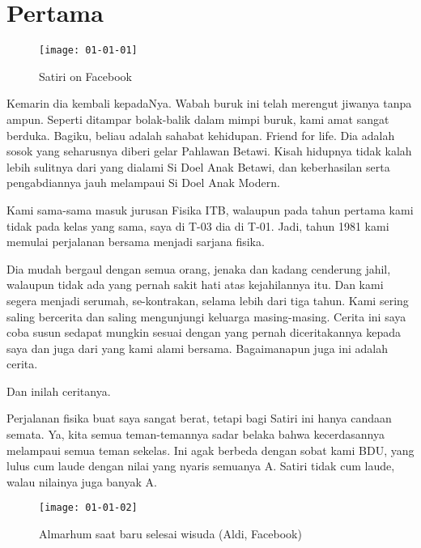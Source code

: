 
\chapter{Pertama}

\begin{figure}[htbp]
\centerline{\texttt{[image: 01-01-01]}}
\caption{Satiri on Facebook}
\label{01-01-01}
\end{figure}
%

\noindent
Kemarin dia kembali kepadaNya. 
Wabah buruk ini telah merengut jiwanya tanpa ampun. 
Seperti ditampar bolak-balik dalam mimpi buruk, kami amat sangat berduka. 
Bagiku, beliau adalah sahabat kehidupan. 
Friend for life. 
Dia adalah sosok yang seharusnya diberi gelar Pahlawan Betawi. 
Kisah hidupnya tidak kalah lebih sulitnya dari yang dialami Si Doel Anak Betawi, 
dan keberhasilan serta pengabdiannya jauh melampaui Si Doel Anak Modern.

Kami sama-sama masuk jurusan Fisika ITB, 
walaupun pada tahun pertama kami tidak pada kelas yang sama, 
saya di T-03 dia di T-01. 
Jadi, tahun 1981 kami memulai perjalanan bersama menjadi sarjana fisika.

Dia mudah bergaul dengan semua orang,
jenaka dan kadang cenderung jahil,
walaupun tidak ada yang pernah sakit hati atas kejahilannya itu.
Dan kami segera menjadi serumah, se-kontrakan, selama lebih dari tiga tahun.
Kami sering saling bercerita dan saling mengunjungi keluarga masing-masing.
Cerita ini saya coba susun sedapat mungkin sesuai dengan yang pernah diceritakannya 
kepada saya dan juga dari yang kami alami bersama.
Bagaimanapun juga ini adalah cerita.

Dan inilah ceritanya.

Perjalanan fisika buat saya sangat berat, tetapi bagi Satiri ini hanya candaan semata. Ya, kita semua teman-temannya sadar belaka bahwa kecerdasannya melampaui semua teman sekelas. Ini agak berbeda dengan sobat kami BDU, yang lulus cum laude dengan nilai yang nyaris semuanya A. Satiri tidak cum laude, walau nilainya juga banyak A.

\begin{figure}[htbp]
\centerline{\texttt{[image: 01-01-02]}}
\caption{Almarhum saat baru selesai wisuda (Aldi, Facebook)}
\label{01-01-02}
\end{figure}
%


